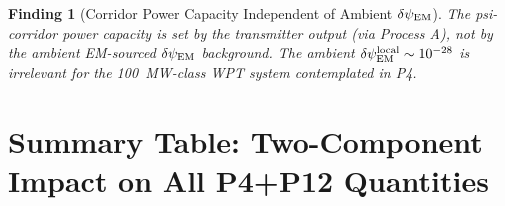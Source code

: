 \documentclass[11pt]{article}
\newtheorem{finding}{Finding}
\newcommand{\dpsiEM}{\delta\psi_{\rm EM}}
\begin{document}
\begin{finding}[Corridor Power Capacity Independent of Ambient $\dpsiEM$]
\label{find:power-capacity}
The psi-corridor power capacity is set by the transmitter output (via
Process A), not by the ambient EM-sourced $\dpsiEM$ background. The
ambient $\dpsiEM^{\rm local} \sim 10^{-28}$ is irrelevant for the
100~MW-class WPT system contemplated in P4.
\end{finding}

\section{Summary Table: Two-Component Impact on All P4+P12 Quantities}
\label{sec:summary-table}
\end{document}
